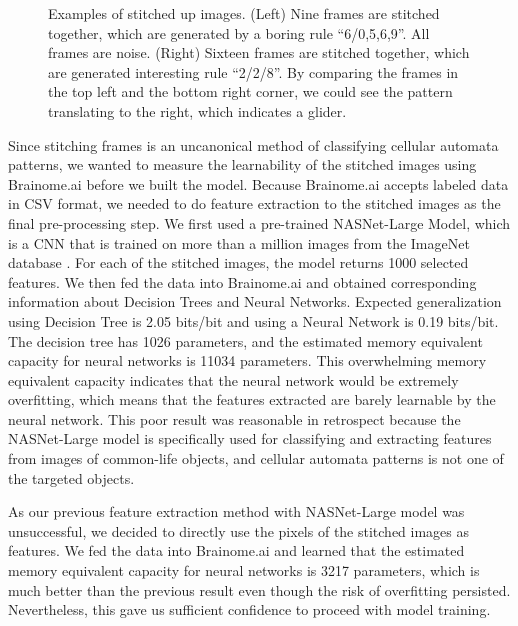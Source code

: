\documentclass[12pt]{article}
\numberwithin{figure}{section} %
\begin{document}
\begin{figure}[H]
\begin{subfigure}{0.53\textwidth}
   \end{subfigure}
   \caption[Examples of stitched images]{Examples of stitched up images. (Left) Nine frames are stitched together, which are generated by a boring rule “6/0,5,6,9”. All frames are noise. (Right) Sixteen frames are stitched together, which are generated interesting rule “2/2/8”. By comparing the frames in the top left and the bottom right corner, we could see the pattern translating to the right, which indicates a glider.}
   \vspace{-1.5em}
   \label{fig:stitched image examples}
\end{figure}

Since stitching frames is an uncanonical method of classifying cellular automata patterns, we wanted to measure the learnability of the stitched images using Brainome.ai \cite{Brainome} before we built the model. Because Brainome.ai accepts labeled data in CSV format, we needed to do feature extraction to the stitched images as the final pre-processing step. We first used a pre-trained NASNet-Large Model, which is a CNN that is trained on more than a million images from the ImageNet database \cite{ImageNet}. For each of the stitched images, the model returns 1000 selected features. We then fed the data into Brainome.ai and obtained corresponding information about Decision Trees and Neural Networks. Expected generalization using Decision Tree is 2.05 bits/bit and using a Neural Network is 0.19 bits/bit.  The decision tree has 1026 parameters, and the estimated memory equivalent capacity for neural networks is 11034 parameters. This overwhelming memory equivalent capacity indicates that the neural network would be extremely overfitting, which means that the features extracted are barely learnable by the neural network. This poor result was reasonable in retrospect because the NASNet-Large model is specifically used for classifying and extracting features from images of common-life objects, and cellular automata patterns is not one of the targeted objects. 

As our previous feature extraction method with NASNet-Large model was unsuccessful, we decided to directly use the pixels of the stitched images as features. We fed the data into Brainome.ai and learned that the estimated memory equivalent capacity for neural networks is 3217 parameters, which is much better than the previous result even though the risk of overfitting persisted. Nevertheless, this gave us sufficient confidence to proceed with model training. 
\end{document}
